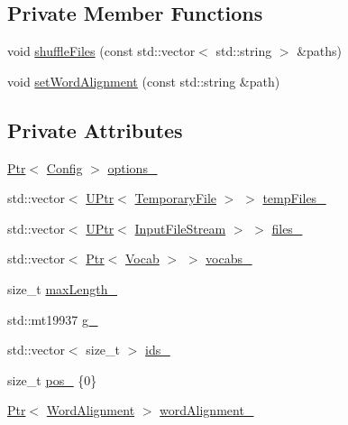 \subsection*{Private Member Functions}
\begin{DoxyCompactItemize}
\item 
void \hyperlink{classmarian_1_1data_1_1Corpus_a79332fb47ae25ab7dbca936dfdc01391}{shuffle\+Files} (const std\+::vector$<$ std\+::string $>$ \&paths)
\item 
void \hyperlink{classmarian_1_1data_1_1Corpus_a8081d9e92cffc981bbb26d9e6c6a9f12}{set\+Word\+Alignment} (const std\+::string \&path)
\end{DoxyCompactItemize}
\subsection*{Private Attributes}
\begin{DoxyCompactItemize}
\item 
\hyperlink{namespacemarian_ad1a373be43a00ef9ce35666145137b08}{Ptr}$<$ \hyperlink{classmarian_1_1Config}{Config} $>$ \hyperlink{classmarian_1_1data_1_1Corpus_aafc430571f253aec977c03bdc4fe0987}{options\+\_\+}
\item 
std\+::vector$<$ \hyperlink{namespacemarian_aef1c1bbe14b70285b1e8f7653f134cb1}{U\+Ptr}$<$ \hyperlink{classTemporaryFile}{Temporary\+File} $>$ $>$ \hyperlink{classmarian_1_1data_1_1Corpus_aa01a09870346c79a900f8938ad1f3be7}{temp\+Files\+\_\+}
\item 
std\+::vector$<$ \hyperlink{namespacemarian_aef1c1bbe14b70285b1e8f7653f134cb1}{U\+Ptr}$<$ \hyperlink{classInputFileStream}{Input\+File\+Stream} $>$ $>$ \hyperlink{classmarian_1_1data_1_1Corpus_a3f3028cb2032b3b4629883fb48328851}{files\+\_\+}
\item 
std\+::vector$<$ \hyperlink{namespacemarian_ad1a373be43a00ef9ce35666145137b08}{Ptr}$<$ \hyperlink{classmarian_1_1Vocab}{Vocab} $>$ $>$ \hyperlink{classmarian_1_1data_1_1Corpus_a25b11761814f5a8f383d1b8d81bcc869}{vocabs\+\_\+}
\item 
size\+\_\+t \hyperlink{classmarian_1_1data_1_1Corpus_a319aa74a24b0f7e865defbb17db817fe}{max\+Length\+\_\+}
\item 
std\+::mt19937 \hyperlink{classmarian_1_1data_1_1Corpus_af02635ddeb7bd28cf197b7167326aeea}{g\+\_\+}
\item 
std\+::vector$<$ size\+\_\+t $>$ \hyperlink{classmarian_1_1data_1_1Corpus_af61cc6f764d82fa6764d7faa6c7c29d8}{ids\+\_\+}
\item 
size\+\_\+t \hyperlink{classmarian_1_1data_1_1Corpus_a71f13714f2aba56a3784f4416656dcce}{pos\+\_\+} \{0\}
\item 
\hyperlink{namespacemarian_ad1a373be43a00ef9ce35666145137b08}{Ptr}$<$ \hyperlink{classmarian_1_1data_1_1WordAlignment}{Word\+Alignment} $>$ \hyperlink{classmarian_1_1data_1_1Corpus_ad6beb16ba8ae3d8fcd2efb1927b42016}{word\+Alignment\+\_\+}
\end{DoxyCompactItemize}
